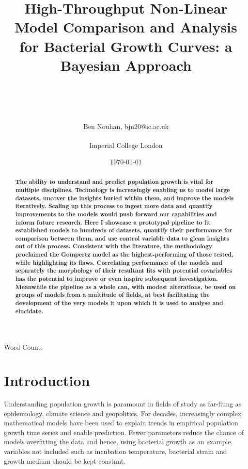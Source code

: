 \documentclass[11pt]{article}
\title{High-Throughput Non-Linear Model Comparison and Analysis for Bacterial Growth Curves: a Bayesian Approach}
\author{\\ \\ \\ \\ Ben Nouhan, bjn20@ic.ac.uk \\ \\ Imperial College London \\}
\date{\today}
\newcommand\wordcount{}
\begin{document}
\vspace{30mm}
\maketitle
\thispagestyle{empty}

\vspace{5mm}
\centerline{Word Count: \wordcount}

\vspace{15mm}
\onehalfspacing
\renewcommand{\abstractname}{\vspace{-\baselineskip}} %

\begin{abstract}
    \linenumbers
    \noindent
    \textbf{The ability to understand and predict population growth is vital for multiple disciplines. Technology is increasingly enabling us to model large datasets, uncover the insights buried within them, and improve the models iteratively. Scaling up this process to ingest more data and quantify improvements to the models would push forward our capabilities and inform future research. Here I showcase a prototypal pipeline to fit established models to hundreds of datasets, quantify their performance for comparison between them, and use control variable data to glean insights out of this process. Consistent with the literature, the methodology proclaimed the Gompertz model as the highest-performing of those tested, while highlighting its flaws. Correlating performance of the models and separately the morphology of their resultant fits with potential covariables has the potential to improve or even inspire subsequent investigation. Meanwhile the pipeline as a whole can, with modest alterations, be used on groups of models from a multitude of fields, at best facilitating the development of the very models it upon which it is used to analyse and elucidate.
    }
\end{abstract}
\vspace{10mm}


\newpage
\tableofcontents
\thispagestyle{empty}

\newpage
\linenumbers
\setcounter{page}{1}
\section{Introduction}%


Understanding population growth is paramount in fields of study as far-flung as epidemiology, climate science and geopolitics.\parencite{Ozgul2010,Peleg1997} For decades, increasingly complex mathematical models have been used to explain trends in empirical population growth time series and enable prediction.\parencite{Kingsland1982,Grijspeerdt1999,Tjørve2017} Fewer parameters reduce the chance of models overfitting the data and hence, using bacterial growth as an example, variables not included such as incubation temperature, bacterial strain and growth medium should be kept constant.
\end{document}
